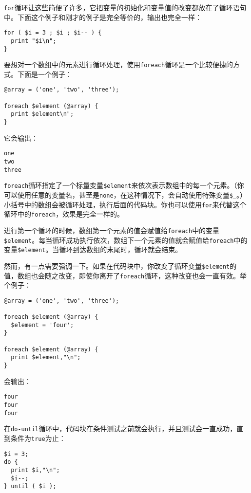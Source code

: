 \verb|for|循环让这些简便了许多，它把变量的初始化和变量值的改变都放在了循环语句中。下面这个例子和刚才的例子是完全等价的，输出也完全一样：

\begin{lstlisting}
for ( $i = 3 ; $i ; $i-- ) {
  print "$i\n";
}
\end{lstlisting}

要想对一个数组中的元素进行循环处理，使用\verb|foreach|循环是一个比较便捷的方式。下面是一个例子：

\begin{lstlisting}
@array = ('one', 'two', 'three');

foreach $element (@array) {
  print $element\n";
}
\end{lstlisting}

它会输出：

\begin{lstlisting}
one
two
three
\end{lstlisting}

\verb|foreach|循环指定了一个标量变量\verb|$element|来依次表示数组中的每一个元素。（你可以使用任意的变量名，甚至是\verb|none|，在这种情况下，会自动使用特殊变量\verb|$_|。）小括号中的数组会被循环处理，执行后面的代码块。你也可以使用\verb|for|来代替这个循环中的\verb|foreach|，效果是完全一样的。

进行第一个循环的时候，数组第一个元素的值会赋值给\verb|foreach|中的变量\verb|$element|。每当循环成功执行依次，数组下一个元素的值就会赋值给\verb|foreach|中的变量\verb|$element|。当循环到达数组的末尾时，循环就会结束。

然而，有一点需要强调一下。如果在代码块中，你改变了循环变量\verb|$element|的值，数组也会随之改变，即使你离开了\verb|foreach|循环，这种改变也会一直有效。举个例子：

\begin{lstlisting}
@array = ('one', 'two', 'three');

foreach $element (@array) {
  $element = 'four';
}

foreach $element (@array) {
  print $element,"\n";
}
\end{lstlisting}

会输出：

\begin{lstlisting}
four
four
four
\end{lstlisting}

在\verb|do-until|循环中，代码块在条件测试之前就会执行，并且测试会一直成功，直到条件为\verb|true|为止：

\begin{lstlisting}
$i = 3;
do {
  print $i,"\n";
  $i--;
} until ( $i );
\end{lstlisting}

